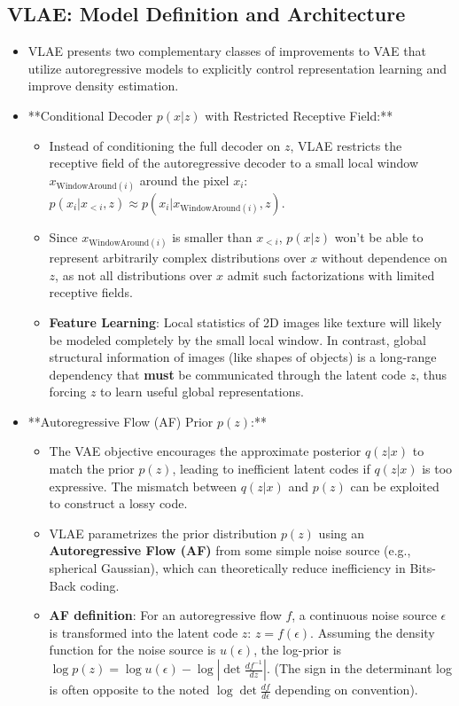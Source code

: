 \documentclass[12pt]{article}
\begin{document}
\subsection{VLAE: Model Definition and Architecture}
\begin{itemize}
    \item VLAE presents two complementary classes of improvements to VAE that utilize autoregressive models to explicitly control representation learning and improve density estimation.
    \item **Conditional Decoder $p(x|z)$ with Restricted Receptive Field:**
    \begin{itemize}
        \item Instead of conditioning the full decoder on $z$, VLAE restricts the receptive field of the autoregressive decoder to a small local window $x_{\text{WindowAround}(i)}$ around the pixel $x_i$: $p(x_i | x_{<i}, z) \approx p(x_i | x_{\text{WindowAround}(i)}, z)$.
        \item Since $x_{\text{WindowAround}(i)}$ is smaller than $x_{<i}$, $p(x|z)$ won't be able to represent arbitrarily complex distributions over $x$ without dependence on $z$, as not all distributions over $x$ admit such factorizations with limited receptive fields.
        \item \textbf{Feature Learning}: Local statistics of 2D images like texture will likely be modeled completely by the small local window. In contrast, global structural information of images (like shapes of objects) is a long-range dependency that \textbf{must} be communicated through the latent code $z$, thus forcing $z$ to learn useful global representations.
    \end{itemize}
    \item **Autoregressive Flow (AF) Prior $p(z)$:**
    \begin{itemize}
        \item The VAE objective encourages the approximate posterior $q(z|x)$ to match the prior $p(z)$, leading to inefficient latent codes if $q(z|x)$ is too expressive. The mismatch between $q(z|x)$ and $p(z)$ can be exploited to construct a lossy code.
        \item VLAE parametrizes the prior distribution $p(z)$ using an \textbf{Autoregressive Flow (AF)} from some simple noise source (e.g., spherical Gaussian), which can theoretically reduce inefficiency in Bits-Back coding.
        \item \textbf{AF definition}: For an autoregressive flow $f$, a continuous noise source $\epsilon$ is transformed into the latent code $z$: $z = f(\epsilon)$. Assuming the density function for the noise source is $u(\epsilon)$, the log-prior is $\log p(z) = \log u(\epsilon) - \log \left| \det \frac{d f^{-1}}{d z} \right|$. (The sign in the determinant log is often opposite to the noted $\log \det \frac{d f}{d \epsilon}$ depending on convention).

\end{itemize}
\end{itemize}
\end{document}
